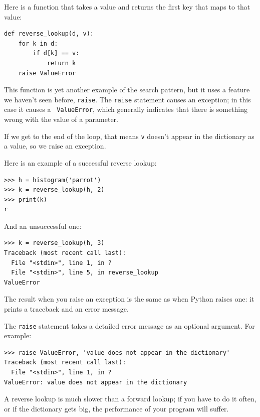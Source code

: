 \documentclass[10pt]{book}
\begin{document}
Here is a function that takes a value and returns the first
key that maps to that value:

\beforeverb
\begin{verbatim}
def reverse_lookup(d, v):
    for k in d:
        if d[k] == v:
            return k
    raise ValueError
\end{verbatim}
\afterverb
%
This function is yet another example of the search pattern, but it
uses a feature we haven't seen before, {\tt raise}.  The {\tt raise}
statement causes an exception; in this case it causes a {\tt
  ValueError}, which generally indicates that there is something wrong
with the value of a parameter.


If we get to the end of the loop, that means {\tt v}
doesn't appear in the dictionary as a value, so we raise an
exception.

Here is an example of a successful reverse lookup:

\beforeverb
\begin{verbatim}
>>> h = histogram('parrot')
>>> k = reverse_lookup(h, 2)
>>> print(k)
r
\end{verbatim}
\afterverb
%
And an unsuccessful one:

\beforeverb
\begin{verbatim}
>>> k = reverse_lookup(h, 3)
Traceback (most recent call last):
  File "<stdin>", line 1, in ?
  File "<stdin>", line 5, in reverse_lookup
ValueError
\end{verbatim}
\afterverb
%
The result when you raise an exception is the same as when
Python raises one: it prints a traceback and an error message.


The {\tt raise} statement takes a detailed error message as an
optional argument.  For example:

\beforeverb
\begin{verbatim}
>>> raise ValueError, 'value does not appear in the dictionary'
Traceback (most recent call last):
  File "<stdin>", line 1, in ?
ValueError: value does not appear in the dictionary
\end{verbatim}
\afterverb
%
A reverse lookup is much slower than a forward lookup; if you
have to do it often, or if the dictionary gets big, the performance
of your program will suffer.
\end{document}
